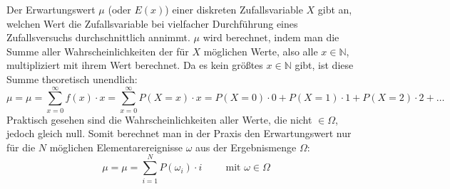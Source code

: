 \begin{figure}[h!]
	\centering
\end{figure}


Der Erwartungswert $\mu$ (oder $E(x)$) einer diskreten Zufallsvariable $X$ gibt an, welchen Wert die Zufallsvariable bei vielfacher Durchf\"{u}hrung eines Zufallsversuchs durchschnittlich annimmt. $\mu$ wird berechnet, indem man die Summe aller Wahrscheinlichkeiten der f\"{u}r $X$ m\"{o}glichen Werte, also alle $x \in \mathbb{N}$, multipliziert mit ihrem Wert berechnet. Da es kein gr\"{o}\ss{}tes $x \in \mathbb{N}$ gibt, ist diese Summe theoretisch unendlich: $$\mu = \mu = \sum_{x=0}^{\infty} f(x) \cdot x = \sum_{x=0}^{\infty} P(X = x) \cdot x = P(X = 0) \cdot 0 + P(X = 1) \cdot 1 + P(X = 2) \cdot 2 + \dots$$ Praktisch gesehen sind die Wahrscheinlichkeiten aller Werte, die nicht $\in \Omega$, jedoch gleich null. Somit berechnet man in der Praxis den Erwartungswert nur f\"{u}r die $N$ m\"{o}glichen Elementarereignisse $\omega$ aus der Ergebnismenge $\Omega$: $$\mu = \mu = \sum_{i=1}^{N} P(\omega_i) \cdot i \hspace{1cm} \text{mit } \omega \in \Omega$$


